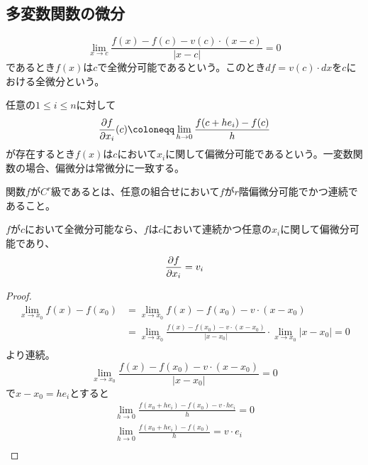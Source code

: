 \subsection{多変数関数の微分}
	\begin{dfn}[全微分]
			\[\lim_{x \to c} \frac{f(x) - f(c) - v(c) \cdot (x - c)}{|x - c|} = 0\]
		であるとき$f(x)$は$c$で全微分可能であるという。このとき$df = v(c) \cdot dx$を$c$における全微分という。
	\end{dfn}
	\begin{dfn}[偏微分]
		任意の$1 \leq i \leq n$に対して
			\[\pd[f]{x_i}(c) \coloneqq \lim_{h \to 0} \frac{f(c + he_i) - f(c)}{h}\]
		が存在するとき$f(x)$は$c$において$x_i$に関して偏微分可能であるという。一変数関数の場合、偏微分は常微分に一致する。
	\end{dfn}
	\begin{dfn}
		関数$f$が$C^r$級であるとは、任意の組合せにおいて$f$が$r$階偏微分可能でかつ連続であること。
	\end{dfn}
	\begin{prop}
		$f$が$c$において全微分可能なら、$f$は$c$において連続かつ任意の$x_i$に関して偏微分可能であり、
			\[\pd[f]{x_i} = v_i\]
	\end{prop}
	\begin{proof}
		\begin{align*}
			\lim_{x \to x_0} f(x) - f(x_0) 
			&= \lim_{x \to x_0} f(x) - f(x_0) - v \cdot (x - x_0)\\
			&= \lim_{x \to x_0} \frac{f(x) - f(x_0) - v \cdot (x - x_0)}{|x - x_0|} \cdot \lim_{x \to x_0} {|x - x_0|} = 0\\
		\end{align*}
		より連続。
			\[\lim_{x \to x_0} \frac{f(x) - f(x_0) - v \cdot (x - x_0)}{|x - x_0|} = 0\]
		で$x - x_0 = he_i$とすると
		\begin{align*}
			\lim_{h \to 0} \frac{f(x_0 + he_i) - f(x_0) - v \cdot he_i}{h} = 0\\
			\lim_{h \to 0} \frac{f(x_0 + he_i) - f(x_0)}{h} = v \cdot e_i\\
		\end{align*}
	\end{proof}


